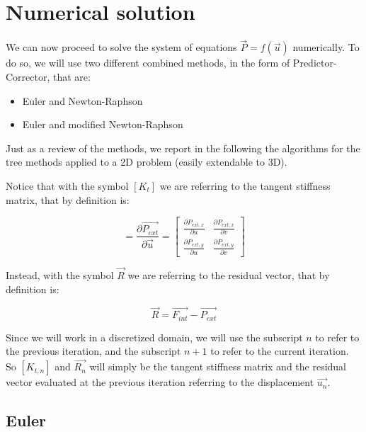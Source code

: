 \section{Numerical solution}
\label{sec:numerical_solution}

We can now proceed to solve the system of equations ${\vec{P}} = f({\vec{u}})$ numerically.
To do so, we will use two different combined methods, in the form of Predictor-Corrector, that are:

\begin{itemize}
    \item Euler and Newton-Raphson
    \item Euler and modified Newton-Raphson
\end{itemize}

Just as a review of the methods, we report in the following the algorithms for the tree methods applied to a 2D problem (easily extendable to 3D).

Notice that with the symbol $[K_t]$ we are referring to the tangent stiffness matrix, that by definition is:

\begin{equation}
    [K_t] = \frac{\partial \vec{P_{ext}}}{\partial \vec{u}}
    =
    \begin{bmatrix}
        \frac{\partial P_{ext,x}}{\partial u} & \frac{\partial P_{ext,x}}{\partial v} \\
        \frac{\partial P_{ext,y}}{\partial u} & \frac{\partial P_{ext,y}}{\partial v}
    \end{bmatrix}
    \label{eq:tangent_stiffness_matrix}
\end{equation}

Instead, with the symbol $\vec{R}$ we are referring to the residual vector, that by definition is:

\begin{equation}
    \vec{R} = \vec{F_{int}} - \vec{P_{ext}}
    \label{eq:residual_vector}
\end{equation}

Since we will work in a discretized domain, we will use the subscript $n$ to refer to the previous iteration, and the subscript $n+1$ to refer to the current iteration.
So $[K_{t,n}]$ and $\vec{R_n}$ will simply be the tangent stiffness matrix and the residual vector evaluated at the previous iteration referring to the displacement $\vec{u_n}$.

\subsection{Euler}

